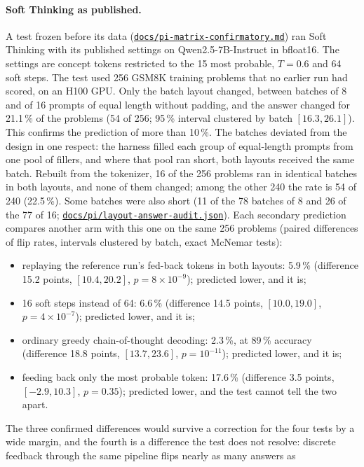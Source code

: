 \documentclass[11pt,letterpaper]{article}
\newcommand{\repourl}{https://github.com/tdj28/neural-shrimp}
\newcommand{\reporef}{arxiv-v1}
\newcommand{\repo}[1]{\href{\repourl/blob/\reporef/#1}{\nolinkurl{#1}}}
\begin{document}
\paragraph{Soft Thinking as published.} A test frozen before its data (\repo{docs/pi-matrix-confirmatory.md}) ran
Soft Thinking with its published settings on Qwen2.5-7B-Instruct in bfloat16. The settings are concept tokens
restricted to the 15 most probable, $T=0.6$ and 64 soft steps. The test used 256 GSM8K training problems that no
earlier run had scored, on an H100 GPU. Only the batch layout changed, between batches of 8 and of 16 prompts of equal
length without padding, and the answer changed for 21.1\,\% of the problems (54 of 256; 95\,\% interval clustered by
batch $[16.3,26.1]$). This confirms the prediction of more than 10\,\%. The batches deviated from the design in one
respect: the harness filled each group of equal-length prompts from one pool of fillers, and where that pool ran
short, both layouts received the same batch. Rebuilt from the tokenizer, 16 of the 256 problems ran in identical
batches in both layouts, and none of them changed; among the other 240 the rate is 54 of 240 (22.5\,\%). Some batches
were also short (11 of the 78 batches of 8 and 26 of the 77 of 16; \repo{docs/pi/layout-answer-audit.json}). Each secondary prediction compares another arm with this one on
the same 256 problems (paired differences of flip rates, intervals clustered by batch, exact McNemar tests):
\begin{itemize}
  \item replaying the reference run's fed-back tokens in both layouts: 5.9\,\% (difference 15.2 points,
  $[10.4,20.2]$, $p=8\times10^{-9}$); predicted lower, and it is;
  \item 16 soft steps instead of 64: 6.6\,\% (difference 14.5 points, $[10.0,19.0]$, $p=4\times10^{-7}$); predicted
  lower, and it is;
  \item ordinary greedy chain-of-thought decoding: 2.3\,\%, at 89\,\% accuracy (difference 18.8 points,
  $[13.7,23.6]$, $p=10^{-11}$); predicted lower, and it is;
  \item feeding back only the most probable token: 17.6\,\% (difference 3.5 points, $[-2.9,10.3]$, $p=0.35$);
  predicted lower, and the test cannot tell the two apart.
\end{itemize}
The three confirmed differences would survive a correction for the four tests by a wide margin, and the fourth is a
difference the test does not resolve: discrete feedback through the same pipeline flips nearly as many answers as
\end{document}
